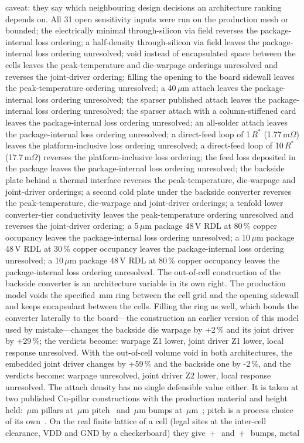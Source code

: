 \documentclass[journal]{IEEEtran}
\begin{document}
caveat: they say which neighbouring design decisions an architecture ranking depends on. All 31 open sensitivity inputs were run on the production mesh or bounded; the electrically minimal through-silicon via field reverses the package-internal loss ordering; a half-density through-silicon via field leaves the package-internal loss ordering unresolved; void instead of encapsulated space between the cells leaves the peak-temperature and die-warpage orderings unresolved and reverses the joint-driver ordering; filling the opening to the board sidewall leaves the peak-temperature ordering unresolved; a 40\,$\mu$m attach leaves the package-internal loss ordering unresolved; the sparser published attach leaves the package-internal loss ordering unresolved; the sparser attach with a column-stiffened card leaves the package-internal loss ordering unresolved; an all-solder attach leaves the package-internal loss ordering unresolved; a direct-feed loop of 1\,$R^{*}$ (1.77\,m$\Omega$) leaves the platform-inclusive loss ordering unresolved; a direct-feed loop of 10\,$R^{*}$ (17.7\,m$\Omega$) reverses the platform-inclusive loss ordering; the feed loss deposited in the package leaves the package-internal loss ordering unresolved; the backside plate behind a thermal interface reverses the peak-temperature, die-warpage and joint-driver orderings; a second cold plate under the backside converter reverses the peak-temperature, die-warpage and joint-driver orderings; a tenfold lower converter-tier conductivity leaves the peak-temperature ordering unresolved and reverses the joint-driver ordering; a 5\,$\mu$m package 48\,V RDL at 80\,\% copper occupancy leaves the package-internal loss ordering unresolved; a 10\,$\mu$m package 48\,V RDL at 30\,\% copper occupancy leaves the package-internal loss ordering unresolved; a 10\,$\mu$m package 48\,V RDL at 80\,\% copper occupancy leaves the package-internal loss ordering unresolved. The out-of-cell construction of the backside converter is an architecture variable in its own right. The production model voids the specified \ClearanceMM\,mm ring between the cell grid and the opening sidewall and keeps encapsulant between the cells. Filling the ring as well, which bonds the converter laterally to the board---the construction an earlier version of this model used by mistake---changes the backside die warpage by +2\,\% and its joint driver by +29\,\%; the verdicts become: warpage Z1 lower, joint driver Z1 lower, local response unresolved. With the out-of-cell volume void in both architectures, the embedded joint driver changes by +59\,\% and the backside one by -2\,\%, and the verdicts become: warpage unresolved, joint driver Z2 lower, local response unresolved.  The attach density has no single defensible value either. It is taken at two published Cu-pillar constructions with the production material and height held: \AttDenseD\,$\mu$m pillars at \AttDenseP\,$\mu$m pitch~\cite{Au2016CuPillar30um} and \AttSparseD\,$\mu$m bumps at \AttSparseP\,$\mu$m~\cite{Na2022SnMicrobump}; pitch is a process choice of its own~\cite{Derakhshandeh2026MicrobumpPitch}. On the real finite lattice of a cell (legal sites at the inter-cell clearance, VDD and GND by a checkerboard) they give \AttDenseNvdd\,+\,\AttDenseNgnd\ and \AttSparseNvdd\,+\,\AttSparseNgnd\ bumps, metal 
\end{document}

